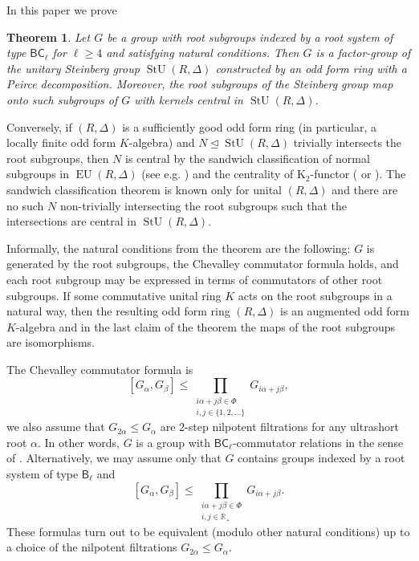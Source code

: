 \documentclass{article}
\newtheorem*{theorem*}{Theorem}
\theoremstyle{definition}
\DeclareMathOperator\eunit{EU}
\DeclareMathOperator\stunit{StU}
\newcommand{\leqt}{\trianglelefteq}
\begin{document}
In this paper we prove
\begin{theorem*}
    Let \(G\) be a group with root subgroups indexed by a root system of type \(\mathsf{BC}_\ell\) for \(\ell \geq 4\) and satisfying natural conditions. Then \(G\) is a factor-group of the unitary Steinberg group \(\stunit(R, \Delta)\) constructed by an odd form ring with a Peirce decomposition. Moreover, the root subgroups of the Steinberg group map onto such subgroups of \(G\) with kernels central in \(\stunit(R, \Delta)\).
\end{theorem*}

Conversely, if \((R, \Delta)\) is a sufficiently good odd form ring (in particular, a locally finite odd form \(K\)-algebra) and \(N \leqt \stunit(R, \Delta)\) trivially intersects the root subgroups, then \(N\) is central by the sandwich classification of normal subgroups in \(\eunit(R, \Delta)\) (see e.g. \cite{preusser-odd}) and the centrality of \(\mathrm K_2\)-functor (\cite{central-ku2} or \cite[theorem 7]{thesis}). The sandwich classification theorem is known only for unital \((R, \Delta)\) and there are no such \(N\) non-trivially intersecting the root subgroups such that the intersections are central in \(\stunit(R, \Delta)\).

Informally, the natural conditions from the theorem are the following: \(G\) is generated by the root subgroups, the Chevalley commutator formula holds, and each root subgroup may be expressed in terms of commutators of other root subgroups. If some commutative unital ring \(K\) acts on the root subgroups in a natural way, then the resulting odd form ring \((R, \Delta)\) is an augmented odd form \(K\)-algebra and in the last claim of the theorem the maps of the root subgroups are isomorphisms.

The Chevalley commutator formula is \[
    [G_\alpha, G_\beta] \leq
    \prod_{\substack{
            i \alpha + j \beta \in \Phi \\
            i, j \in \{1, 2, \ldots\}
    } } G_{i \alpha + j \beta},
\] we also assume that \(G_{2 \alpha} \leq G_\alpha\) are \(2\)-step nilpotent filtrations for any ultrashort root \(\alpha\). In other words, \(G\) is a group with \(\mathsf{BC}_\ell\)-commutator relations in the sense of \cite{st-jordan}. Alternatively, we may assume only that \(G\) contains groups indexed by a root system of type \(\mathsf B_\ell\) and \[
    [G_\alpha, G_\beta] \leq
    \prod_{\substack{
        i \alpha + j \beta \in \Phi \\
        i, j \in \mathbb R_+
    } } G_{i \alpha + j \beta}.
\] These formulas turn out to be equivalent (modulo other natural conditions) up to a choice of the nilpotent filtrations \(G_{2 \alpha} \leq G_\alpha\).
\end{document}
